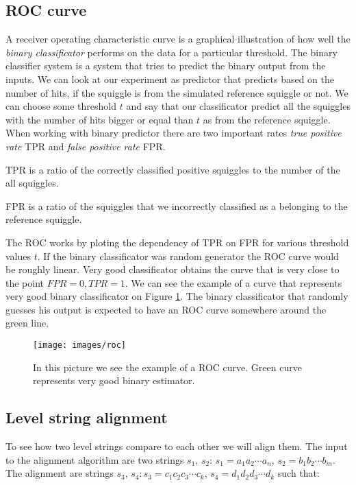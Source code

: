 \subsection{ROC curve}

A receiver operating characteristic curve is a graphical illustration of how well
the \textit{binary classificator} performs on the data for a particular threshold. The binary
classifier system is a system that tries to predict the binary output from the inputs.
We can look at our experiment as predictor that predicts based on the number of hits, if the squiggle is from the
simulated reference squiggle or not. We can choose some threshold $t$ and say that
our classificator predict all the squiggles with the number of hits bigger or equal
than $t$ as from the reference squiggle. When working with binary predictor there
are two important rates \textit{true positive rate} TPR and \textit{false positive rate} FPR. 

TPR is a ratio of the correctly classified positive squiggles to the number of the all squiggles.

FPR is a ratio of the squiggles that we incorrectly classified as a belonging to the reference squiggle.

The ROC works by ploting the dependency of TPR on FPR for various threshold values $t$.
If the binary classificator was random generator the ROC curve would be roughly
linear. Very good classificator obtains the curve that is very close to the point
$FPR = 0, TPR = 1$. We can see the example of a curve that represents very good
binary classificator on Figure \ref{obr:roc}. The binary classificator that randomly
guesses his output is expected to have an ROC curve somewhere around the green line.

\begin{figure}
\centerline{\texttt{[image: images/roc]}}
\caption[TODO]{In this picture we see the example of a ROC curve. Green curve represents very good
binary estimator.}
\label{obr:roc}
\end{figure}

\subsection{Level string alignment}
\label{section:alignment}

To see how two level strings compare to each other we will align them. The input
to the alignment algorithm are two strings $s_1$, $s_2$:
$s_1=a_1a_2\cdots a_n$, $s_2=b_1b_2\cdots b_m$. The alignment are strings
$s_3$, $s_4: s_3 = c_1c_2c_3\cdots c_k$, $s_4 = d_1d_2d_3\cdots d_k$ such that:

